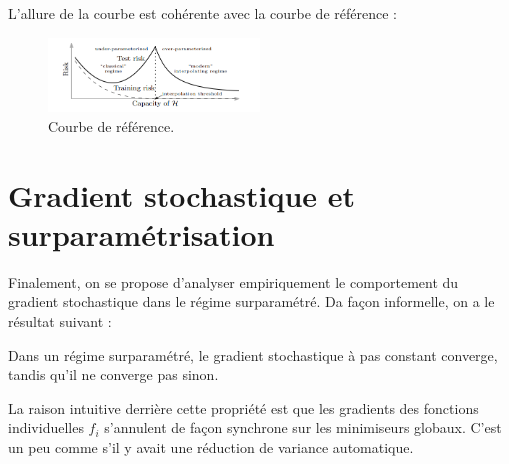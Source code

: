 \documentclass[12pt,a4paper]{article}
\begin{document}
\begin{enumerate}
    L'allure de la courbe est cohérente avec la courbe de référence :
    \begin{figure}[ht]
        \centering
        \includegraphics[width=0.5\textwidth]{src/courbe_reference.png}
        \caption{Courbe de référence.}
        \label{fig:courbe_reference}
    \end{figure}
\end{enumerate}




\section{Gradient stochastique et surparamétrisation}
Finalement, on se propose d’analyser empiriquement le comportement du gradient stochastique dans le régime surparamétré.
Da façon informelle, on a le résultat suivant :

\begin{tcolorbox}[colback=red!5!white,colframe=red!25!black]
    Dans un régime surparamétré, le gradient stochastique à pas constant converge, tandis qu’il ne converge pas sinon.
\end{tcolorbox}


La raison intuitive derrière cette propriété est que les gradients des fonctions individuelles $f_i$ s’annulent de façon synchrone sur les minimiseurs globaux.
C’est un peu comme s’il y avait une réduction de variance automatique.
\end{document}
